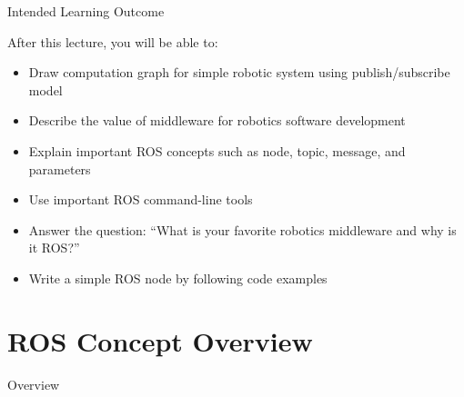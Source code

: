 \documentclass[aspectratio=43]{beamer}
\begin{document}
\begin{frame}{Intended Learning Outcome}
	\begin{block}{After this lecture, you will be able to:}
		\begin{itemize}
			\item<0> Draw computation graph for simple robotic system using publish/subscribe model
			\item<1> Describe the value of middleware for robotics software development
			\item<0> Explain important ROS concepts such as node, topic, message, and parameters
			\item<0> Use important ROS command-line tools
			\item<0> Answer the question: ``What is your favorite robotics middleware and why is it ROS?''
			\item<0> Write a simple ROS node by following code examples
		\end{itemize}
	\end{block}
\end{frame}

\section{ROS Concept Overview}
\begin{frame}[label=overview]{Overview}
	\tableofcontents[sectionstyle=show/shaded,subsectionstyle=show/shaded/shaded]
\end{frame}
\end{document}
